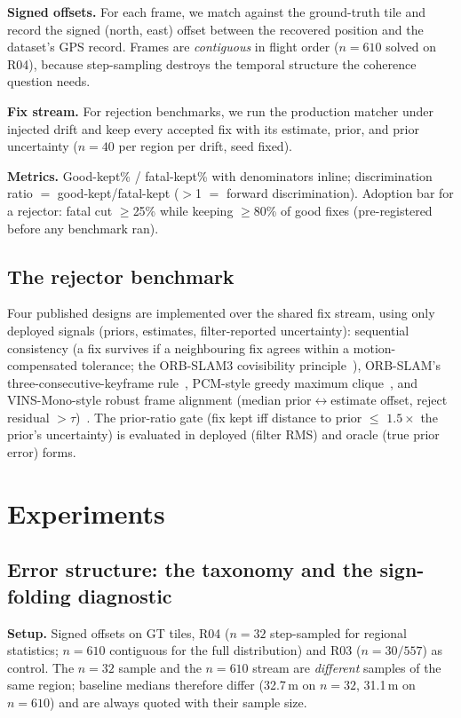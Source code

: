 \documentclass[journal]{IEEEtran}
\begin{document}
\textbf{Signed offsets.} For each frame, we match against the ground-truth tile and record the signed (north, east) offset between the recovered position and the dataset's GPS record. Frames are \emph{contiguous} in flight order ($n=610$ solved on R04), because step-sampling destroys the temporal structure the coherence question needs.

\textbf{Fix stream.} For rejection benchmarks, we run the production matcher under injected drift and keep every accepted fix with its estimate, prior, and prior uncertainty ($n=40$ per region per drift, seed fixed).

\textbf{Metrics.} Good-kept\% / fatal-kept\% with denominators inline; discrimination ratio $=$ good-kept/fatal-kept ($>$1 $=$ forward discrimination). Adoption bar for a rejector: fatal cut $\geq$25\% while keeping $\geq$80\% of good fixes (pre-registered before any benchmark ran).

\subsection{The rejector benchmark}
Four published designs are implemented over the shared fix stream, using only deployed signals (priors, estimates, filter-reported uncertainty): sequential consistency (a fix survives if a neighbouring fix agrees within a motion-compensated tolerance; the ORB-SLAM3 covisibility principle~\cite{orbslam3}), ORB-SLAM's three-consecutive-keyframe rule~\cite{orbslam}, PCM-style greedy maximum clique~\cite{mangelson2018}, and VINS-Mono-style robust frame alignment (median prior$\leftrightarrow$estimate offset, reject residual $>\tau$)~\cite{vinsmono}. The prior-ratio gate (fix kept iff distance to prior $\leq$ $1.5\times$ the prior's uncertainty) is evaluated in deployed (filter RMS) and oracle (true prior error) forms.

\section{Experiments}
\label{sec:exp}

\subsection{Error structure: the taxonomy and the sign-folding diagnostic}
\label{sec:structure}

\textbf{Setup.} Signed offsets on GT tiles, R04 ($n=32$ step-sampled for regional statistics; $n=610$ contiguous for the full distribution) and R03 ($n=30/557$) as control. The $n=32$ sample and the $n=610$ stream are \emph{different} samples of the same region; baseline medians therefore differ (32.7\,m on $n=32$, 31.1\,m on $n=610$) and are always quoted with their sample size.
\end{document}
